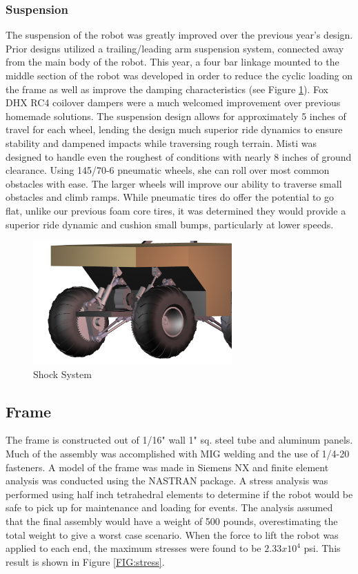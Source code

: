 \subsubsection{Suspension}
The suspension of the robot was greatly improved over the previous year’s design. Prior designs utilized a trailing/leading arm suspension system, connected away from the main body of the robot. This year, a four bar linkage mounted to the middle section of the robot was developed in order to reduce the cyclic loading on the frame as well as improve the damping characteristics  (see Figure \ref{FIG:Shock}). Fox DHX RC4 coilover dampers were a much welcomed improvement over previous homemade solutions. The suspension design allows for approximately 5 inches of travel for each wheel, lending the design much superior ride dynamics to ensure stability and dampened impacts while traversing rough terrain.
Misti was designed to handle even the roughest of conditions with nearly 8 inches of ground clearance. Using 145/70-6 pneumatic wheels, she can roll over most common obstacles with ease. The larger wheels will improve our ability to traverse small obstacles and climb ramps. While pneumatic tires do offer the potential to go flat, unlike our previous foam core tires, it was determined they would provide a superior ride dynamic and cushion small bumps, particularly at lower speeds.
\begin{figure}[H]
\begin{center}
\includegraphics[width=3in]{./Pics/Suspension-Far.png}
\caption{Shock System}
\label{FIG:Shock}
\end{center}
\end{figure}



\subsection{Frame}
The frame is constructed out of 1/16" wall 1" sq. steel tube and aluminum panels. Much of the assembly was accomplished with MIG welding and the use of 1/4-20 fasteners. A model of the frame was made in Siemens NX and finite element analysis was conducted using the NASTRAN package. A stress analysis was performed using half inch tetrahedral elements to determine if the robot would be safe to pick up for maintenance and loading for events. The analysis assumed that the final assembly would have a weight of 500 pounds, overestimating the total weight to give a worst case scenario. When the force to lift the robot was applied to each end, the maximum stresses were found to be $2.33x10^4$ psi. This result is shown in Figure \ref{FIG:stress}.


